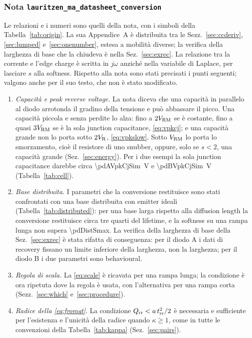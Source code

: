 \documentclass[10pt,a4paper]{scrartcl}
\let\newcommand\pdvaluedefine
\newcommand{\VR}{V_\mathrm{R}}
\newcommand{\Qrr}{Q_\mathrm{rr}}
\newcommand{\trr}{t_\mathrm{rr}}
\newcommand{\Vrm}{V_\mathrm{RM}}
\begin{document}
\subsubsection*{Nota \texttt{lauritzen\_ma\_datasheet\_conversion}}
Le relazioni e i numeri sono quelli della nota, con i simboli della Tabella~\ref{tab:origin}. La sua Appendice~A è distribuita tra le Sezz.~\ref{sec:ccderiv}, \ref{sec:lumped} e~\ref{sec:onenumber}, estesa a mobilità diverse; la verifica della larghezza di base che la chiudeva è nella Sez.~\ref{sec:exrec}. La relazione tra la corrente e l'edge charge è scritta in $j\omega$ anziché nella variabile di Laplace, per lasciare $s$ alla softness. Rispetto alla nota sono stati precisati i punti seguenti; valgono anche per il suo testo, che non è stato modificato.
\begin{enumerate}
\item \emph{Capacità e peak reverse voltage.} La nota diceva che una capacità in parallelo al diodo arrotonda il gradino della tensione e può abbassare il picco. Una capacità piccola e senza perdite lo alza: fino a $2\Vrm$ se è costante, fino a quasi $3\Vrm$ se è la sola junction capacitance, \eqref{eq:vpkcj}; e una capacità grande non lo porta sotto $2\VR$, \eqref{eq:vpkslow}. Sotto $\Vrm$ lo porta lo smorzamento, cioè il resistore di uno snubber, oppure, solo se $s < 2$, una capacità grande (Sez.~\ref{sec:energy}). Per i due esempi la sola junction capacitance darebbe circa \SI{\pdAVpkCjSim}{\volt} e \SI{\pdBVpkCjSim}{\volt} (Tabella~\ref{tab:cell}).
\item \emph{Base distribuita.} I parametri che la conversione restituisce sono stati confrontati con una base distribuita con emitter ideali (Tabella~\ref{tab:distributed}): per una base larga rispetto alla diffusion length la conversione restituisce circa tre quarti del lifetime, e la softness su una rampa lunga non supera \num{\pdDistSmax}. La verifica della larghezza di base della Sez.~\ref{sec:exrec} è stata rifatta di conseguenza: per il diodo A i dati di recovery fissano un limite inferiore della larghezza, non la larghezza; per il diodo B i due parametri sono behavioural.
\item \emph{Regola di scala.} La \eqref{eq:scale} è ricavata per una rampa lunga; la condizione è ora ripetuta dove la regola è usata, con l'alternativa per una rampa corta (Sezz.~\ref{sec:which} e~\ref{sec:procedure}).
\item \emph{Radice della \eqref{eq:fromqt}.} La condizione $\Qrr < a\,\trr^2/2$ è necessaria e sufficiente per l'esistenza e l'unicità della radice quando $\kappa \geq 1$, come in tutte le convenzioni della Tabella~\ref{tab:kappa} (Sez.~\ref{sec:pairs}).

\end{enumerate}
\end{document}
